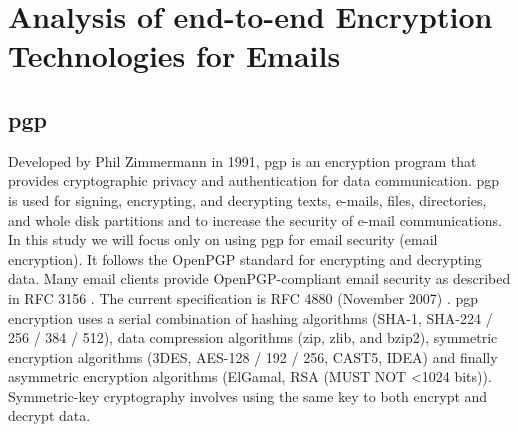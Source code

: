 \section{Analysis of end-to-end Encryption Technologies for Emails}
\label{chap:analysis-encryption}

\subsection{ \acrfull{pgp} }
\label{chap:analysis-pgp}

Developed by Phil Zimmermann in 1991, \acrfull{pgp} is an encryption program that provides cryptographic privacy and authentication for data communication. \acrshort{pgp} is used for signing, encrypting, and decrypting texts, e-mails, files, directories, and whole disk partitions and to increase the security of e-mail communications. In this study we will focus only on using \acrshort{pgp} for \acrshort{email} security (\acrshort{email} encryption). It follows the OpenPGP standard for encrypting and decrypting data. Many \acrshort{email} clients provide OpenPGP-compliant \acrshort{email} security as described in RFC 3156 \cite{rfc3156}. The current specification is RFC 4880 (November 2007) \cite{rfc4880}. \acrshort{pgp} encryption uses a serial combination of hashing algorithms (SHA-1, SHA-224 / 256 / 384 / 512), data compression algorithms (zip, zlib, and bzip2), symmetric encryption algorithms (3DES, AES-128 / 192 / 256, CAST5, IDEA) and finally asymmetric encryption algorithms (ElGamal, RSA (MUST NOT <1024 bits)). Symmetric-key cryptography involves using the same key to both encrypt and decrypt data.

